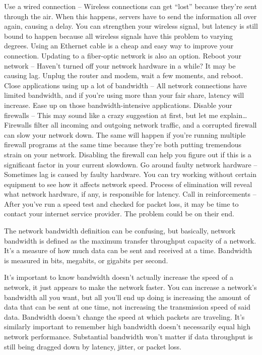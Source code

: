 Use a wired connection – Wireless connections can get “lost” because they’re sent through the air. When this happens, servers have to send the information all over again, causing a delay. You can strengthen your wireless signal, but latency is still bound to happen because all wireless signals have this problem to varying degrees. Using an Ethernet cable is a cheap and easy way to improve your connection. Updating to a fiber-optic network is also an option.
Reboot your network – Haven’t turned off your network hardware in a while? It may be causing lag. Unplug the router and modem, wait a few moments, and reboot.
Close applications using up a lot of bandwidth – All network connections have limited bandwidth, and if you’re using more than your fair share, latency will increase. Ease up on those bandwidth-intensive applications.
Disable your firewalls – This may sound like a crazy suggestion at first, but let me explain… Firewalls filter all incoming and outgoing network traffic, and a corrupted firewall can slow your network down. The same will happen if you’re running multiple firewall programs at the same time because they’re both putting tremendous strain on your network. Disabling the firewall can help you figure out if this is a significant factor in your current slowdown.
Go around faulty network hardware – Sometimes lag is caused by faulty hardware. You can try working without certain equipment to see how it affects network speed. Process of elimination will reveal what network hardware, if any, is responsible for latency.
Call in reinforcements – After you’ve run a speed test and checked for packet loss, it may be time to contact your internet service provider. The problem could be on their end.

The network bandwidth definition can be confusing, but basically, network bandwidth is defined as the maximum transfer throughput capacity of a network. It’s a measure of how much data can be sent and received at a time. Bandwidth is measured in bits, megabits, or gigabits per second.

It’s important to know bandwidth doesn’t actually increase the speed of a network, it just appears to make the network faster. You can increase a network’s bandwidth all you want, but all you’ll end up doing is increasing the amount of data that can be sent at one time, not increasing the transmission speed of said data. Bandwidth doesn’t change the speed at which packets are traveling. It’s similarly important to remember high bandwidth doesn’t necessarily equal high network performance. Substantial bandwidth won’t matter if data throughput is still being dragged down by latency, jitter, or packet loss.


